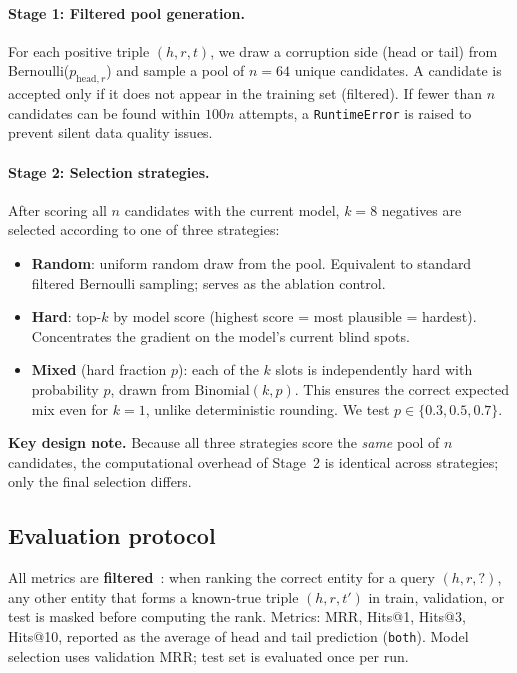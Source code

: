 \documentclass[10pt,twocolumn,letterpaper]{article}
\begin{document}
\paragraph{Stage 1: Filtered pool generation.}
For each positive triple $(h,r,t)$, we draw a corruption side (head or tail)
from Bernoulli($p_{\mathrm{head},r}$) and sample a pool of $n=64$ unique
candidates. A candidate is accepted only if it does not appear in the training
set (filtered). If fewer than $n$ candidates can be found within
$100n$ attempts, a \texttt{RuntimeError} is raised to prevent silent
data quality issues.

\paragraph{Stage 2: Selection strategies.}
After scoring all $n$ candidates with the current model, $k=8$ negatives are
selected according to one of three strategies:

\begin{itemize}
  \item \textbf{Random}: uniform random draw from the pool. Equivalent to
    standard filtered Bernoulli sampling; serves as the ablation control.
  \item \textbf{Hard}: top-$k$ by model score (highest score = most plausible
    = hardest). Concentrates the gradient on the model's current blind spots.
  \item \textbf{Mixed} (hard fraction $p$): each of the $k$ slots is
    independently hard with probability $p$, drawn from $\mathrm{Binomial}(k,p)$.
    This ensures the correct expected mix even for $k=1$, unlike deterministic
    rounding. We test $p\in\{0.3,0.5,0.7\}$.
\end{itemize}

\textbf{Key design note.} Because all three strategies score the \emph{same}
pool of $n$ candidates, the computational overhead of Stage~2 is identical
across strategies; only the final selection differs.

\subsection{Evaluation protocol}

All metrics are \textbf{filtered}~\cite{bordes2013translating}: when ranking
the correct entity for a query $(h,r,?)$, any other entity that forms a
known-true triple $(h,r,t')$ in train, validation, or test is masked before
computing the rank.
Metrics: MRR, Hits@1, Hits@3, Hits@10, reported as the average of head and
tail prediction (\texttt{both}).
Model selection uses validation MRR; test set is evaluated once per run.
\end{document}
